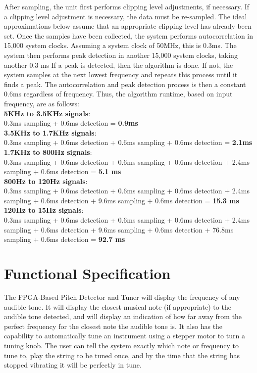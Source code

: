 \documentclass[aps,letterpaper,10pt]{revtex4}
\begin{document}
After sampling, the unit first performs clipping level adjustments, if necessary. If a clipping level adjustment is necessary, the data must be re-sampled. The ideal approximations below assume that an appropriate clipping level has already been set. Once the samples have been collected, the system performs autocorrelation in 15,000 system clocks. Assuming a system clock of 50MHz, this is 0.3ms. The system then performs peak detection in another 15,000 system clocks, taking another 0.3 ms If a peak is detected, then the algorithm is done. If not, the system samples at the next lowest frequency and repeats this process until it finds a peak. The autocorrelation and peak detection process is then a constant 0.6ms regardless of frequency. Thus, the algorithm runtime, based on input frequency, are as follows: \\

\noindent \textbf{5KHz to 3.5KHz signals}: \\
0.3ms sampling + 0.6ms detection = \textbf{0.9ms}\\

\noindent \textbf{3.5KHz to 1.7KHz signals}: \\
0.3ms sampling + 0.6ms detection + 0.6ms sampling + 0.6ms detection = \textbf{2.1ms}\\

\noindent \textbf{1.7KHz to 800Hz signals}: \\
0.3ms sampling + 0.6ms detection + 0.6ms sampling + 0.6ms detection + 2.4ms sampling + 0.6ms detection = \textbf{5.1 ms}\\

\noindent \textbf{800Hz to 120Hz signals}: \\
0.3ms sampling + 0.6ms detection + 0.6ms sampling + 0.6ms detection + 2.4ms sampling + 0.6ms detection + 9.6ms sampling + 0.6ms detection = \textbf{15.3 ms}\\

\noindent \textbf{120Hz to 15Hz signals}: \\
0.3ms sampling + 0.6ms detection + 0.6ms sampling + 0.6ms detection + 2.4ms sampling + 0.6ms detection + 9.6ms sampling + 0.6ms detection + 76.8ms sampling + 0.6ms detection = \textbf{92.7 ms}\\


\section{Functional Specification}
The FPGA-Based Pitch Detector and Tuner will display the frequency of any audible tone. It will display the closest musical note (if appropriate) to the audible tone detected, and will display an indication of how far away from the perfect frequency for the closest note the audible tone is. It also has the capability to automatically tune an instrument using a stepper motor to turn a tuning knob. The user can tell the system exactly which note or frequency to tune to, play the string to be tuned once, and by the time that the string has stopped vibrating it will be perfectly in tune. \\
\end{document}
